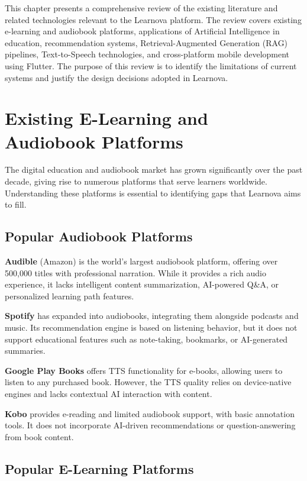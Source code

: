 This chapter presents a comprehensive review of the existing literature and
related technologies relevant to the Learnova platform. The review covers
existing e-learning and audiobook platforms, applications of Artificial
Intelligence in education, recommendation systems, Retrieval-Augmented
Generation (RAG) pipelines, Text-to-Speech technologies, and cross-platform
mobile development using Flutter. The purpose of this review is to identify
the limitations of current systems and justify the design decisions adopted
in Learnova.

\section{Existing E-Learning and Audiobook Platforms}
\label{sec:existing}

The digital education and audiobook market has grown significantly over the
past decade, giving rise to numerous platforms that serve learners worldwide.
Understanding these platforms is essential to identifying gaps that Learnova
aims to fill.

\subsection{Popular Audiobook Platforms}

\textbf{Audible} (Amazon) is the world's largest audiobook platform, offering
over 500,000 titles with professional narration. While it provides a rich
audio experience, it lacks intelligent content summarization, AI-powered
Q\&A, or personalized learning path features.

\textbf{Spotify} has expanded into audiobooks, integrating them alongside
podcasts and music. Its recommendation engine is based on listening behavior,
but it does not support educational features such as note-taking, bookmarks,
or AI-generated summaries.

\textbf{Google Play Books} offers TTS functionality for e-books, allowing
users to listen to any purchased book. However, the TTS quality relies on
device-native engines and lacks contextual AI interaction with content.

\textbf{Kobo} provides e-reading and limited audiobook support, with basic
annotation tools. It does not incorporate AI-driven recommendations or
question-answering from book content.

\subsection{Popular E-Learning Platforms}

